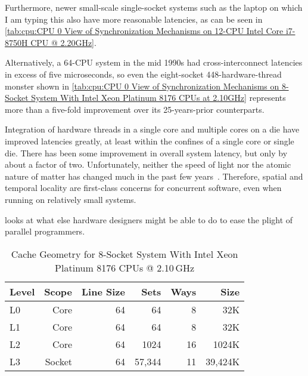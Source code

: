 {	Furthermore, newer small-scale single-socket systems such
	as the laptop on which I am typing this also have more
	reasonable latencies, as can be seen in
	\cref{tab:cpu:CPU 0 View of Synchronization Mechanisms on 12-CPU Intel Core i7-8750H CPU @ 2.20GHz}.

	Alternatively, a 64-CPU system in the mid 1990s had
	cross-interconnect latencies in excess of five microseconds,
	so even the eight-socket 448-hardware-thread monster shown in
	\cref{tab:cpu:CPU 0 View of Synchronization Mechanisms on 8-Socket System With Intel Xeon Platinum 8176 CPUs at 2.10GHz}
	represents more than a five-fold improvement over its
	25-years-prior counterparts.

	Integration of hardware threads in a single core and multiple
	cores on a die have improved latencies greatly, at least within the
	confines of a single core or single die.
	There has been some improvement in overall system latency,
	but only by about a factor of two.
	Unfortunately, neither the speed of light nor the atomic nature
	of matter has changed much in the past few
	years~\cite{NoBugsHare2016CPUoperations}.
	Therefore, spatial and temporal locality are first-class concerns
	for concurrent software, even when running on relatively
	small systems.

	looks at what else hardware designers might be
	able to do to ease the plight of parallel programmers.
}\QuickQuizEnd

\begin{table}
\renewcommand*{\arraystretch}{1.1}
\centering\small
\begin{tabular}{lrrrrr}
	\toprule
	Level &  Scope & Line Size &   Sets & Ways &    Size \\
	\midrule
	L0    &   Core &        64 &     64 &    8 &     32K \\
	L1    &   Core &        64 &     64 &    8 &     32K \\
	L2    &   Core &        64 &   1024 &   16 &   1024K \\
	L3    & Socket &        64 & 57,344 &   11 & 39,424K \\
	\bottomrule
\end{tabular}
\caption{Cache Geometry for 8-Socket System With Intel Xeon Platinum 8176 CPUs @ 2.10\,GHz}
\label{tab:cpu:Cache Geometry for 8-Socket System With Intel Xeon Platinum 8176 CPUs @ 2.10GHz}
\end{table}

